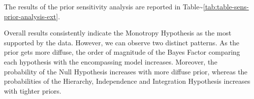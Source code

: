 \documentclass[
]{book}
\begin{document}
The results of the prior sensitivity analysis are reported in Table\textasciitilde\ref{tab:table-sens-prior-analysis-ext}.

\begin{table}[!h]

\caption{\label{tab:table-sens-prior-analysis-ext}Bayes Factor encompassing model v and hypothesis posterior probabilities (PP) under different prior settings  ($n_{subj} = 847$).}
\centering
{}
\end{table}

Overall results consistently indicate the Monotropy Hypothesis as the most supported by the data. However, we can observe two distinct patterns. As the prior gets more diffuse, the order of magnitude of the Bayes Factor comparing each hypothesis with the encompassing model increases. Moreover, the probability of the Null Hypothesis increases with more diffuse prior, whereas the probabilities of the Hierarchy, Independence and Integration Hypothesis increases with tighter priors.
\end{document}
